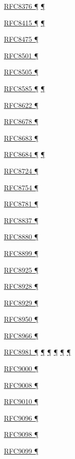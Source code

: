 \documentclass[
]{article}
\begin{document}
\hyperref[layer-2-functions]{RFC8376 ¶} \hyperref[energy-consumption]{¶}

\hyperref[managed-configuration]{RFC8415 ¶}
\hyperref[address-planning]{¶}

\hyperref[multi-prefix-operation]{RFC8475 ¶}

\hyperref[dns]{RFC8501 ¶}

\hyperref[address-resolution]{RFC8505 ¶}

\hyperref[routing]{RFC8585 ¶} \hyperref[dual-stack-scenarios]{¶}

\hyperref[traffic-class-and-flow-label]{RFC8622 ¶}

\hyperref[multi-prefix-operation]{RFC8678 ¶}

\hyperref[translation-and-ipv4-as-a-service]{RFC8683 ¶}

\hyperref[transport-protocols]{RFC8684 ¶} \hyperref[multihoming]{¶}

\hyperref[energy-consumption]{RFC8724 ¶}

\hyperref[extension-headers-and-options]{RFC8754 ¶}

\hyperref[translation-and-ipv4-as-a-service]{RFC8781 ¶}

\hyperref[traffic-class-and-flow-label]{RFC8837 ¶}

\hyperref[translation-and-ipv4-as-a-service]{RFC8880 ¶}

\hyperref[extension-headers-and-options]{RFC8899 ¶}

\hyperref[dual-stack-scenarios]{RFC8925 ¶}

\hyperref[address-resolution]{RFC8928 ¶}

\hyperref[address-resolution]{RFC8929 ¶}

\hyperref[routing]{RFC8950 ¶}

\hyperref[routing]{RFC8966 ¶}

\hyperref[addresses]{RFC8981 ¶} \hyperref[auto-configuration]{¶}
\hyperref[layer-2-considerations]{¶} \hyperref[topology-obfuscation]{¶}
\hyperref[address-and-prefix-management]{¶}
\hyperref[multi-prefix-operation]{¶}

\hyperref[transport-protocols]{RFC9000 ¶}

\hyperref[routing]{RFC9008 ¶}

\hyperref[routing]{RFC9010 ¶}

\hyperref[routing]{RFC9096 ¶}

\hyperref[extension-headers-and-options]{RFC9098 ¶}

\hyperref[security]{RFC9099 ¶}
\end{document}
